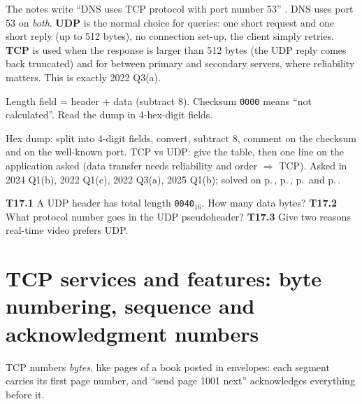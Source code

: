 \begin{examtip}
The notes write ``DNS uses TCP protocol with port number 53'' . DNS uses port 53 on \emph{both}.
\textbf{UDP} is the normal choice for queries: one short request and one short reply (up to 512 bytes), no connection set-up, the client simply retries.
\textbf{TCP} is used when the response is larger than 512 bytes (the UDP reply comes back truncated) and for  between primary and secondary servers, where reliability matters.
This is exactly 2022 Q3(a).
\end{examtip}

\begin{warningbox}
Length field = header + data (subtract 8). Checksum \texttt{0000} means ``not calculated''. Read the dump in 4-hex-digit fields.
\end{warningbox}

\begin{answerplan}[1--2.5 marks]
Hex dump: split into 4-digit fields, convert, subtract 8, comment on the checksum and on the well-known port. TCP vs UDP: give the table, then one line on the
application asked (data transfer needs reliability and order $\Rightarrow$ TCP). Asked in 2024 Q1(b), 2022 Q1(c), 2022 Q3(a), 2025 Q1(b); solved on
p.\,\pageref{q:MS2024-1b}, p.\,\pageref{q:MS2022-1c}, p.\,\pageref{q:MS2022-3a} and p.\,\pageref{q:MS2025-1b}.
\par{} \textbf{T17.1} A UDP header has total length \texttt{0040}$_{16}$. How many data bytes?\quad
\textbf{T17.2} What protocol number goes in the UDP pseudoheader?\quad
\textbf{T17.3} Give two reasons real-time video prefers UDP.
\end{answerplan}

\section{TCP services and features: byte numbering, sequence and acknowledgment numbers}\label{sec:T18}
  

\begin{intuitionbox}
TCP numbers \emph{bytes}, like pages of a book posted in envelopes: each segment carries its first page number, and ``send page 1001 next'' acknowledges everything before it.
\end{intuitionbox}

